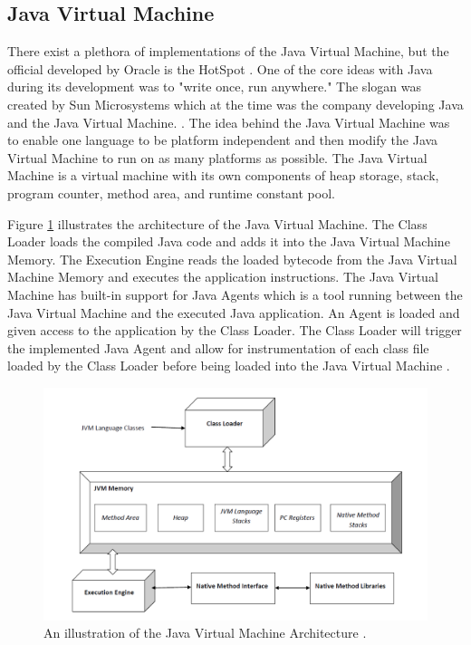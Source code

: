 \subsection{Java Virtual Machine}
There exist a plethora of implementations of the Java Virtual Machine, but the official developed by Oracle is the HotSpot \parencite{hotSpot}. One of the core ideas with Java during its development was to "write once, run anywhere." The slogan was created by Sun Microsystems which at the time was the company developing Java and the Java Virtual Machine. \parencite{Craig_2006}. The idea behind the Java Virtual Machine was to enable one language to be platform independent and then modify the Java Virtual Machine to run on as many platforms as possible. The Java Virtual Machine is a virtual machine with its own components of heap storage, stack, program counter, method area, and runtime constant pool.

Figure \ref{fig:JVM} illustrates the architecture of the Java Virtual Machine. The Class Loader loads the compiled Java code and adds it into the Java Virtual Machine Memory. The Execution Engine reads the loaded bytecode from the Java Virtual Machine Memory and executes the application instructions. The Java Virtual Machine has built-in support for Java Agents which is a tool running between the Java Virtual Machine and the executed Java application. An Agent is loaded and given access to the application by the Class Loader. The Class Loader will trigger the implemented Java Agent and allow for instrumentation of each class file loaded by the Class Loader before being loaded into the Java Virtual Machine \parencite{venners_1999, instru}.

\begin{figure}[H]
  \centering
  \includegraphics[width=\textwidth]{images/JvmSpec7.png}
  \caption{An illustration of the Java Virtual Machine Architecture \parencite{jvm}. }
  \label{fig:JVM}
\end{figure}


